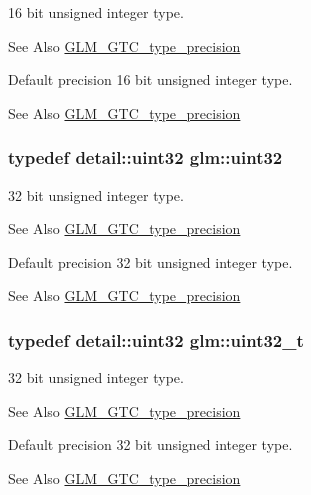 16 bit unsigned integer type. \begin{DoxySeeAlso}{See Also}
\hyperlink{group__gtc__type__precision}{G\-L\-M\-\_\-\-G\-T\-C\-\_\-type\-\_\-precision}
\end{DoxySeeAlso}
Default precision 16 bit unsigned integer type. \begin{DoxySeeAlso}{See Also}
\hyperlink{group__gtc__type__precision}{G\-L\-M\-\_\-\-G\-T\-C\-\_\-type\-\_\-precision} 
\end{DoxySeeAlso}
\hypertarget{group__gtc__type__precision_ga202b6a53c105fcb7e531f9b443518451}{
\subsubsection[{uint32}]{\setlength{\rightskip}{0pt plus 5cm}typedef detail\-::uint32 {\bf glm\-::uint32}}}\label{group__gtc__type__precision_ga202b6a53c105fcb7e531f9b443518451}
32 bit unsigned integer type. \begin{DoxySeeAlso}{See Also}
\hyperlink{group__gtc__type__precision}{G\-L\-M\-\_\-\-G\-T\-C\-\_\-type\-\_\-precision}
\end{DoxySeeAlso}
Default precision 32 bit unsigned integer type. \begin{DoxySeeAlso}{See Also}
\hyperlink{group__gtc__type__precision}{G\-L\-M\-\_\-\-G\-T\-C\-\_\-type\-\_\-precision} 
\end{DoxySeeAlso}
\hypertarget{group__gtc__type__precision_ga822ca53a9ad412504532838906276a99}{
\subsubsection[{uint32\-\_\-t}]{\setlength{\rightskip}{0pt plus 5cm}typedef detail\-::uint32 {\bf glm\-::uint32\-\_\-t}}}\label{group__gtc__type__precision_ga822ca53a9ad412504532838906276a99}
32 bit unsigned integer type. \begin{DoxySeeAlso}{See Also}
\hyperlink{group__gtc__type__precision}{G\-L\-M\-\_\-\-G\-T\-C\-\_\-type\-\_\-precision}
\end{DoxySeeAlso}
Default precision 32 bit unsigned integer type. \begin{DoxySeeAlso}{See Also}
\hyperlink{group__gtc__type__precision}{G\-L\-M\-\_\-\-G\-T\-C\-\_\-type\-\_\-precision} 
\end{DoxySeeAlso}
